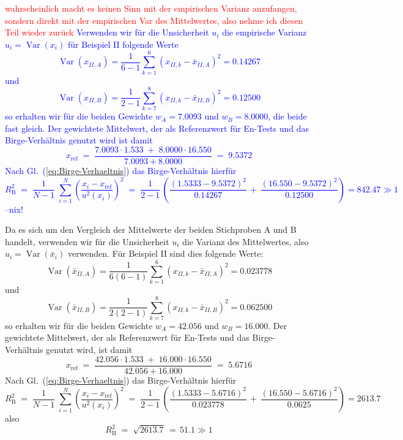 \textcolor{red}{wahrscheinlich macht es keinen Sinn mit der empirischen Varianz
anzufangen, sondern direkt mit der empirischen Var des Mittelwertes, also nehme ich
diesen Teil wieder zurück}
\textcolor{blue}{Verwenden wir für die Unsicherheit $u_i$ die empirische Varianz
$u_i = \operatorname{Var}(x_i)$ für Beispiel II folgende Werte
$$
\operatorname{Var}(x_{II,A}) = 
\frac{1}{6-1} \sum\limits_{k=1}^{6} \left(x_{II,k} - \bar x_{II,A} \right)^2 = 0.14267
$$
und
$$
\operatorname{Var}(x_{II,B}) = \frac{1}{2-1} \sum\limits_{k=7}^{8} \left(x_{II,k} - \bar x_{II,B} \right)^2
= 0.12500
$$ 
so erhalten wir für die beiden Gewichte $w_A = 7.0093$ und $w_B = 8.0000$, die beide fast gleich.
Der gewichtete Mittelwert, der als Referenzwert für En-Tests und das Birge-Verhältnis genutzt wird ist damit
$$
x_\mathrm{ref} \; = \; \frac{7.0093 \cdot 1.533 \; + \; 8.0000 \cdot 16.550}{7.0093 + 8.0000}
\; = \; 9.5372
$$
Nach Gl.~(\ref{eq:Birge-Verhaeltnis}) das Birge-Verhältnis hierfür
$$
R^2_\mathrm{B} \; = \; \frac{1}{N-1} \; \sum_{i=1}^N \left( \frac{x_i-x_\mathrm{ref}}{u^2(x_i)} \right)^2 \; = \;
 \frac{1}{2-1} \, \left( \frac{\left(1.5333 - 9.5372\right)^2}{0.14267}
 \, + \, \frac{ \left( 16.550 - 9.5372 \right)^2}{0.12500} \right) = 842.47 \gg 1
$$
--nix!}

Da es sich um den Vergleich der Mittelwerte der beiden Stichproben A und B handelt, verwenden wir
für die Unsicherheit $u_i$ die Varianz des Mittelwertes, also
$u_i = \operatorname{Var}(\bar x_i)$ verwenden. Für Beispiel II sind dies folgende Werte:
$$
\operatorname{Var}(\bar x_{II,A}) = \frac{1}{6(6-1)} \sum\limits_{k=1}^{6} \left(x_{II,k} - \bar x_{II,A} \right)^2 = 0.023778
$$
und
$$
\operatorname{Var}(\bar x_{II,B}) = \frac{1}{2(2-1)} \sum\limits_{k=7}^{8} \left(x_{II,k} - \bar x_{II,B} \right)^2 = 0.062500
\label{eq:VarianzenMWII}
$$
so erhalten wir für die beiden Gewichte $w_A = 42.056$ und $w_B = 16.000$.
Der gewichtete Mittelwert, der als Referenzwert für En-Tests und das Birge-Verhältnis genutzt wird, ist damit
$$
x_\mathrm{ref} \; = \; \frac{42.056 \cdot 1.533 \; + \; 16.000 \cdot 16.550}{42.056 + 16.000}
\; = \; 5.6716
$$
Nach Gl.~(\ref{eq:Birge-Verhaeltnis}) das Birge-Verhältnis hierfür
$$
R^2_\mathrm{B} \; = \; \frac{1}{N-1} \; \sum_{i=1}^N \left( \frac{x_i-x_\mathrm{ref}}{u^2(x_i)} \right)^2 \; = \;
 \frac{1}{2-1} \, \left( \frac{\left(1.5333 - 5.6716\right)^2}{0.023778}
 \, + \, \frac{ \left( 16.550 - 5.6716 \right)^2}{0.0625} \right) = 2613.7
$$
also
$$
R^2_\mathrm{B} \; = \; \sqrt{2613.7} \, = \, 51.1  \gg 1
$$



